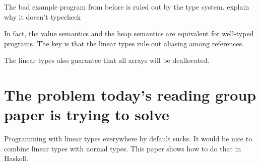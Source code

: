 \documentclass{article}
\newcommand{\todo}[1]{{\color{red} #1}}
\newcommand{\kw}[1]{\ensuremath{\mathsf{#1}}}
\newcommand{\bool}{\ensuremath{\kw{bool}}}
\newcommand{\tyint}{\ensuremath{\kw{int}}}
\newcommand{\tyarray}{\ensuremath{\kw{array}}}
\newcommand{\linto}{\ensuremath{\multimap}}
\newcommand{\true}{\ensuremath{\kw{true}}}
\newcommand{\false}{\ensuremath{\kw{false}}}
\newcommand{\IF}[3]{\ensuremath{\kw{if}\ #1\ \kw{then}\ #2\ \kw{else}\ #3}}
\newcommand{\Colon}{{\hspace{1pt}:\hspace{1pt}}}
\newcommand{\COLON}{\mathrel{\,:\,}}
\newcommand{\fun}{\ensuremath{\kw{fun}}}
\newcommand{\fix}[5]{\fun\ #1\ (#2\Colon#3):#4 = #5}
\newcommand{\hastype}[3]{\ensuremath{#1\mathrel{\,\vdash\,}#2 \COLON #3}}
\newcommand{\haslintype}[3]{\ensuremath{#1\mathrel{\,\Vdash\,}#2 \COLON #3}}
\begin{document}
{
\def\MathparLineskip {\lineskiplimit=1.2em\lineskip=2.5em plus 0.2em}

{
\setlength{\fboxsep}{5pt}
\fbox{\haslintype{\gamma}{e}{\tau}}
}
}

The bad example program from before is ruled out by the type
system. \todo{explain why it doesn't typecheck}

In fact, the value semantics and the heap semantics are equivalent for
well-typed programs. The key is that the linear types rule out
aliasing among references.

The linear types also guarantee that all arrays will be deallocated.

\section*{The problem today's reading group paper is trying to solve}

Programming with linear types everywhere by default sucks. It would be nice
to combine linear types with normal types. This paper shows how to do that
in Haskell.
\end{document}
